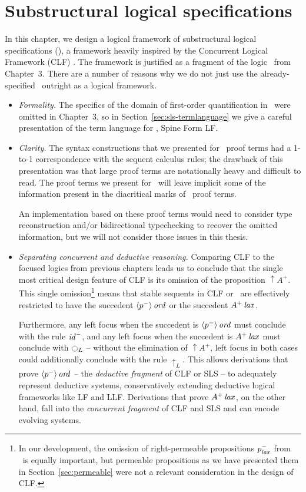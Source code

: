\chapter{Substructural logical specifications}
\label{chapter-framework}

In this chapter, we design a logical framework of substructural
logical specifications (\sls), a framework heavily inspired by the
Concurrent Logical Framework (CLF) \cite{watkins02concurrent}. The
framework is justified as a fragment of the logic \ollll~from
Chapter~3. There are a number of reasons why we do not just use the
already-specified \ollll~outright as a logical framework.
%
\smallskip
\begin{itemize}
\item{\it Formality.} The specifics of the domain of first-order
  quantification in \ollll~were omitted in Chapter~3, so in
  Section~\ref{sec:sls-termlanguage} we give a careful presentation of
  the term language for \sls, Spine Form LF.

\item{\it Clarity.} The syntax constructions that we presented for
  \ollll~proof terms had a 1-to-1 correspondence with the sequent
  calculus rules; the drawback of this presentation was that large
  proof terms are notationally heavy and difficult to read. The proof
  terms we present for \sls~will leave implicit some of the
  information present in the diacritical marks of \ollll~proof
  terms. 

  An implementation based on these proof terms would need to consider
  type reconstruction and/or bidirectional typechecking to recover the
  omitted information, but we will not consider those issues in this
  thesis.

\item{\it Separating concurrent and deductive reasoning.} Comparing
  CLF to the focused logics from previous chapters leads us to
  conclude that the single most critical design feature of CLF is its
  omission of the proposition ${\uparrow}A^+$. This single
  omission\footnote{In our development, the omission of
    right-permeable propositions $p^-_{\it lax}$ from \ollll~is equally
    important, but permeable propositions as we have presented them in
    Section~\ref{sec:permeable} were not a relevant consideration in
    the design of CLF.} means that stable sequents in CLF or \sls~are
  effectively restricted to have the succedent ${\langle {p^-} \rangle}\,{{\it ord}}$
  or the succedent ${A^+}\,{{\it lax}}$.

  Furthermore, any left focus when the succedent is
  ${\langle {p^-} \rangle}\,{{\it ord}}$ must conclude with the rule ${\it id}^-$, and
  any left focus when the succedent is ${A^+}\,{{\it lax}}$ must conclude
  with ${\ocircle}_L$ -- without the elimination of ${\uparrow}A^+$,
  left focus in both cases could additionally conclude with the rule
  ${\uparrow}_L$. This allows derivations that prove
  ${\langle {p^-} \rangle}\,{{\it ord}}$ -- the {\it deductive fragment} of CLF or SLS
  -- to adequately represent deductive systems, conservatively
  extending deductive logical frameworks like LF and LLF. Derivations
  that prove ${A^+}\,{{\it lax}}$, on the other hand, fall into the {\it
    concurrent fragment} of CLF and SLS and can encode evolving
  systems.
 

\end{itemize}
